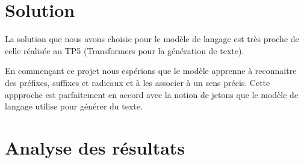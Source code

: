 \documentclass[french]{template}
\begin{document}
\section{Solution}

La solution que nous avons choisie pour le modèle de langage est très proche de celle réalisée au TP5 (Transformers pour la génération de texte).

En commençant ce projet nous espérions que le modèle apprenne à reconnaitre des préfixes, suffixes et radicaux et à les associer à un sens précis. Cette appproche est parfaitement en accord avec la notion de jetons que le modèle de langage utilise pour générer du texte.


\section{Analyse des résultats}

\end{document}
